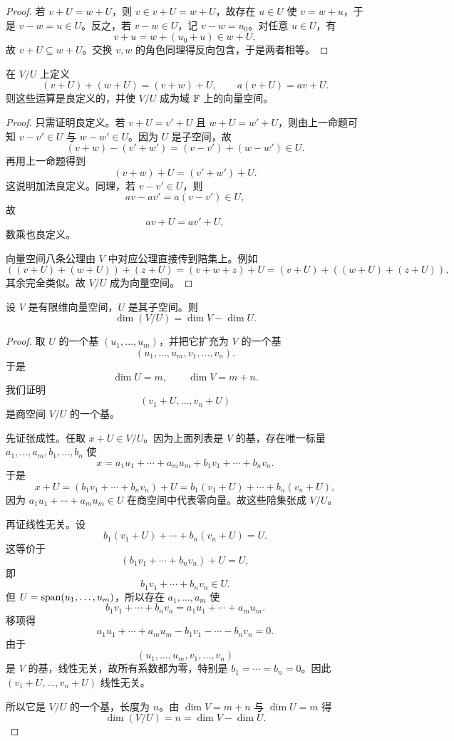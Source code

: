 \begin{proof} 若 $v+U=w+U$，则 $v\in v+U=w+U$，故存在 $u\in U$ 使 $v=w+u$，于是 $v-w=u\in U$。反之，若 $v-w\in U$，记 $v-w=u_0$。对任意 $u\in U$，有
\[ v+u=w+(u_0+u)\in w+U, \]
故 $v+U\subseteq w+U$。交换 $v,w$ 的角色同理得反向包含，于是两者相等。
\end{proof}

\begin{proposition} 在 $V/U$ 上定义
\[ (v+U)+(w+U)=(v+w)+U, \qquad a(v+U)=av+U. \]
则这些运算是良定义的，并使 $V/U$ 成为域 $\mathbb{F}$ 上的向量空间。
\end{proposition}

\begin{proof} 只需证明良定义。若 $v+U=v'+U$ 且 $w+U=w'+U$，则由上一命题可知 $v-v'\in U$ 与 $w-w'\in U$。因为 $U$ 是子空间，故
\[ (v+w)-(v'+w')=(v-v')+(w-w')\in U. \]
再用上一命题得到
\[ (v+w)+U=(v'+w')+U. \]
这说明加法良定义。同理，若 $v-v'\in U$，则
\[ av-av'=a(v-v')\in U, \]
故
\[ av+U=av'+U, \]
数乘也良定义。

向量空间八条公理由 $V$ 中对应公理直接传到陪集上。例如
\[ ((v+U)+(w+U))+(z+U)=(v+w+z)+U=(v+U)+((w+U)+(z+U)), \]
其余完全类似。故 $V/U$ 成为向量空间。
\end{proof}

\begin{theorem} 设 $V$ 是有限维向量空间，$U$ 是其子空间。则
\[ \dim(V/U)=\dim V-\dim U. \]
\end{theorem}

\begin{proof} 取 $U$ 的一个基 $(u_1,\dots,u_m)$，并把它扩充为 $V$ 的一个基
\[ (u_1,\dots,u_m,v_1,\dots,v_n). \]
于是
\[ \dim U=m, \qquad \dim V=m+n. \]
我们证明
\[ (v_1+U,\dots,v_n+U) \]
是商空间 $V/U$ 的一个基。

先证张成性。任取 $x+U\in V/U$。因为上面列表是 $V$ 的基，存在唯一标量 $a_1,\dots,a_m,b_1,\dots,b_n$ 使
\[ x=a_1u_1+\cdots+a_mu_m+b_1v_1+\cdots+b_nv_n. \]
于是
\[ x+U=(b_1v_1+\cdots+b_nv_n)+U=b_1(v_1+U)+\cdots+b_n(v_n+U), \]
因为 $a_1u_1+\cdots+a_mu_m\in U$ 在商空间中代表零向量。故这些陪集张成 $V/U$。

再证线性无关。设
\[ b_1(v_1+U)+\cdots+b_n(v_n+U)=U. \]
这等价于
\[ (b_1v_1+\cdots+b_nv_n)+U=U, \]
即
\[ b_1v_1+\cdots+b_nv_n\in U. \]
但 $U=\operatorname{span}(u_1,\dots,u_m)$，所以存在 $a_1,\dots,a_m$ 使
\[ b_1v_1+\cdots+b_nv_n=a_1u_1+\cdots+a_mu_m. \]
移项得
\[ a_1u_1+\cdots+a_mu_m-b_1v_1-\cdots-b_nv_n=0. \]
由于
\[ (u_1,\dots,u_m,v_1,\dots,v_n) \]
是 $V$ 的基，线性无关，故所有系数都为零，特别是 $b_1=\cdots=b_n=0$。因此 $(v_1+U,\dots,v_n+U)$ 线性无关。

所以它是 $V/U$ 的一个基，长度为 $n$。由 $\dim V=m+n$ 与 $\dim U=m$ 得
\[ \dim(V/U)=n=\dim V-\dim U. \]
\end{proof}

